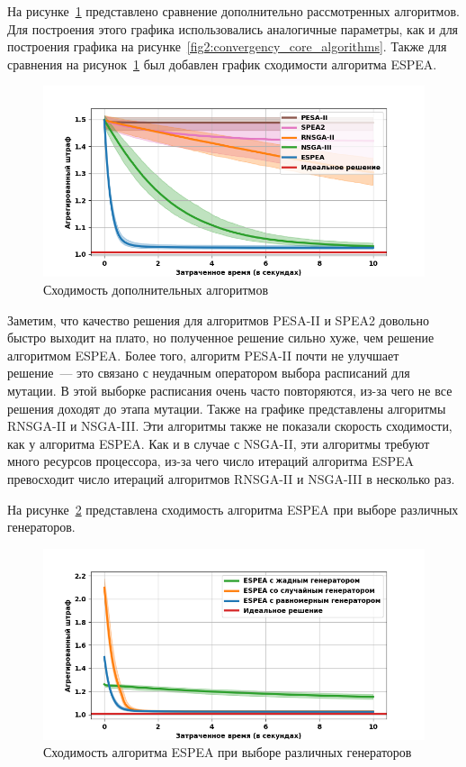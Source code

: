 \documentclass[times,specification,annotation]{itmo-student-thesis}
\begin{document}
На рисунке~\ref{fig2:convergency_additional_algorithms} представлено сравнение дополнительно рассмотренных алгоритмов.
Для построения этого графика использовались аналогичные параметры, как и для построения графика на рисунке~\ref{fig2:convergency_core_algorithms}.
Также для сравнения на рисунок~\ref{fig2:convergency_additional_algorithms} был добавлен график сходимости алгоритма ESPEA.

\begin{figure}
\caption{Сходимость дополнительных алгоритмов}\label{fig2:convergency_additional_algorithms}
\centering
\includegraphics[width=1\columnwidth]{additional_algorithms_convergency.png}
\end{figure}

Заметим, что качество решения для алгоритмов PESA-II и SPEA2 довольно быстро выходит на плато, но полученное решение сильно хуже, чем решение алгоритмом ESPEA.
Более того, алгоритм PESA-II почти не улучшает решение~--- это связано с неудачным оператором выбора расписаний для мутации.
В этой выборке расписания очень часто повторяются, из-за чего не все решения доходят до этапа мутации.
Также на графике представлены алгоритмы RNSGA-II и NSGA-III.
Эти алгоритмы также не показали скорость сходимости, как у алгоритма ESPEA.
Как и в случае с NSGA-II, эти алгоритмы требуют много ресурсов процессора, из-за чего число итераций алгоритма ESPEA превосходит число итераций алгоритмов RNSGA-II и NSGA-III в несколько раз.

На рисунке~\ref{fig2:convergency_different_generators} представлена сходимость алгоритма ESPEA при выборе различных генераторов.

\begin{figure}
\caption{Сходимость алгоритма ESPEA при выборе различных генераторов}\label{fig2:convergency_different_generators}
\centering
\includegraphics[width=1\columnwidth]{generators_algorithms_convergency.png}
\end{figure}
\end{document}
